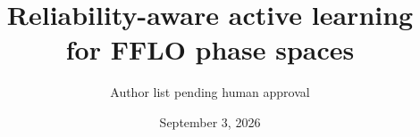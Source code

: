 \documentclass[aps,prl,reprint,superscriptaddress,floatfix]{revtex4-2}
\begin{document}
\title{Reliability-aware active learning for FFLO phase spaces}
\author{Author list pending human approval}
\date{September 3, 2026}
\begin{abstract}\end{abstract}
\maketitle





\end{document}
